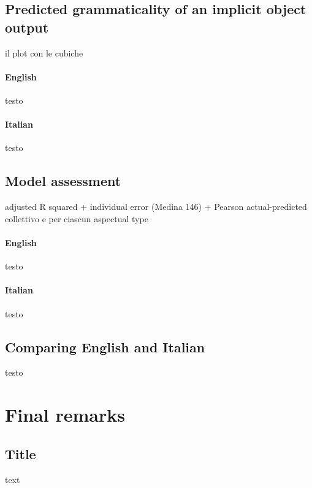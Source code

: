 \subsection{Predicted grammaticality of an implicit object output} 

il plot con le cubiche

\paragraph{English} testo

\paragraph{Italian} testo


\subsection{Model assessment} 

adjusted R squared + 
individual error (Medina 146) +
Pearson actual-predicted collettivo e per ciascun aspectual type

\paragraph{English} testo

\paragraph{Italian} testo


\subsection{Comparing English and Italian} 

testo


\section{Final remarks} 

\subsection{Title} 

text
